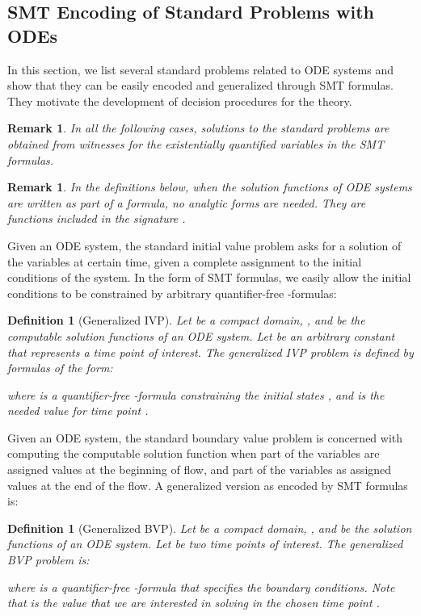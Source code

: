 \documentclass[12pt]{article}
\newtheorem{definition}[theorem]{Definition}
\newtheorem{remark}[theorem]{Remark}
\begin{document}
\subsection{SMT Encoding of Standard Problems with ODEs}
\label{encoding}
In this section, we list several standard problems related to ODE systems and show that they can be easily encoded and generalized through SMT formulas. They motivate the development of decision procedures for the theory. 
\begin{remark}
In all the following cases, solutions to the standard problems are obtained from witnesses for the existentially quantified variables in the SMT formulas.
\end{remark}
\begin{remark}
In the definitions below, when the solution functions  of ODE systems are written as part of a formula, no analytic forms are needed. They are functions included in the signature . 
\end{remark}
 Given an ODE system, the standard initial value problem asks for a solution of the variables at certain time, given a complete assignment to the initial conditions of the system. In the form of SMT formulas, we easily allow the initial conditions to be constrained by arbitrary quantifier-free -formulas:
\begin{definition}[Generalized IVP]
Let  be a compact domain, , and  be the computable solution functions of an ODE system.  Let  be an arbitrary constant that represents a time point of interest. The generalized IVP problem is defined by formulas of the form:

where  is a quantifier-free -formula constraining the initial states , and  is the needed value for time point . 
\end{definition}
 Given an ODE system, the standard boundary value problem is concerned with computing the computable solution function when part of the variables are assigned values at the beginning of flow, and part of the variables as assigned values at the end of the flow. A generalized version as encoded by SMT formulas is:
\begin{definition}[Generalized BVP]
Let  be a compact domain, , and  be the solution functions of an ODE system. Let  be two time points of interest. The generalized BVP problem is:

where  is a quantifier-free -formula that specifies the boundary conditions. Note that  is the value that we are interested in solving in the chosen time point .
\end{definition}
\end{document}
